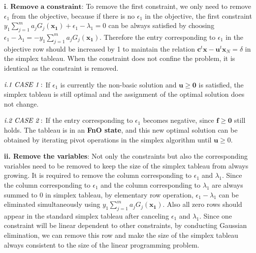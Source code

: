 \documentclass[letterpaper]{article}
\begin{document}
$\textbf{i. Remove a constraint:}$
To remove the first constraint, we only need to remove $\epsilon_1$ from the objective, because if there is no $\epsilon_1$ in the objective, the first constraint
$y_1\sum_{j=1}^m a_jG_j(\mathbf{x_1}) + \epsilon_{1} - \lambda_{1} = 0$
can be always satisfied by choosing $\epsilon_1 - \lambda_1 = - y_1\sum_{j=1}^m a_jG_j(\mathbf{x_1})$. Therefore the entry corresponding to $\epsilon_1$ in the objective row should be increased by 1 to maintain the relation $\mathbf{c}^t\mathbf{x} - \mathbf{u}^t\mathbf{x}_{N} = \delta$ in the simplex tableau. When the constraint does not confine the problem, it is identical as the constraint is removed.

\indent\indent$\emph{i.1 CASE 1}:$ If $\epsilon_1$ is currently the non-basic solution and $\mathbf{u} \geq \mathbf{0}$ is satisfied, the simplex tableau is still optimal and the assignment of the optimal solution does not change.

\indent\indent$\emph{i.2 CASE 2}:$ If the entry corresponding to $\epsilon_1$ becomes negative, since $\mathbf{f} \geq \mathbf{0}$ still holds. The tableau is in an \textbf{FnO state}, and this new optimal solution can be obtained by iterating pivot operations in the simplex algorithm until $\mathbf{u}\ge 0$.

\textbf{ii. Remove the variables}: Not only the constraints but also the corresponding variables need to be removed to keep the size of the simplex tableau from always growing. It is required to remove the column corresponding to $\epsilon_1$ and $\lambda_1$. Since the column corresponding to $\epsilon_1$ and the column corresponding to $\lambda_1$ are always summed to $0$ in simplex tableau, by elementary row operation, $\epsilon_1 - \lambda_1$ can be eliminated simultaneously using $y_1\sum_{j=1}^m a_jG_j(\mathbf{x_1})$. Also all zero rows should appear in the standard simplex tableau after canceling $\epsilon_1$ and $\lambda_1$. Since one constraint will be linear dependent to other constraints, by conducting Gaussian elimination, we can remove this row and make the size of the simplex tableau always consistent to the size of the linear programming problem.
\end{document}
